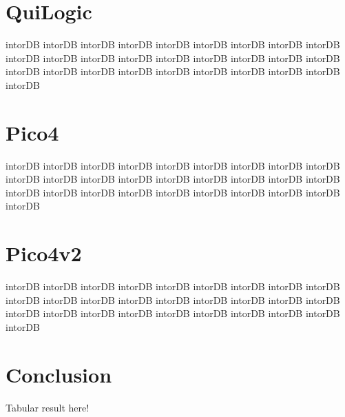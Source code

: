 		\section{QuiLogic}
		intorDB intorDB intorDB intorDB intorDB intorDB intorDB 
		intorDB intorDB intorDB intorDB intorDB intorDB intorDB 
		intorDB intorDB intorDB intorDB intorDB intorDB intorDB 
		intorDB intorDB intorDB intorDB intorDB intorDB intorDB 
		
		\section{Pico4}
		intorDB intorDB intorDB intorDB intorDB intorDB intorDB 
		intorDB intorDB intorDB intorDB intorDB intorDB intorDB 
		intorDB intorDB intorDB intorDB intorDB intorDB intorDB 
		intorDB intorDB intorDB intorDB intorDB intorDB intorDB 
		
		\section{Pico4v2}
		intorDB intorDB intorDB intorDB intorDB intorDB intorDB 
		intorDB intorDB intorDB intorDB intorDB intorDB intorDB 
		intorDB intorDB intorDB intorDB intorDB intorDB intorDB 
		intorDB intorDB intorDB intorDB intorDB intorDB intorDB 
		
		\section{Conclusion}
		Tabular result here!